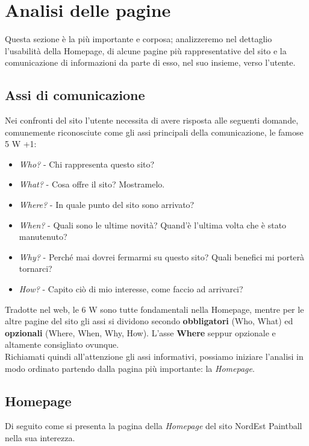 \documentclass[../Relazione.tex]{subfiles}
\begin{document}
\section{Analisi delle pagine}
Questa sezione è la più importante e corposa; analizzeremo nel dettaglio l'usabilità della Homepage, di alcune pagine più rappresentative del sito e la comunicazione di informazioni da parte di esso, nel suo insieme, verso l'utente.
    \subsection{Assi di comunicazione}
    Nei confronti del sito l'utente necessita di avere risposta alle seguenti domande, comunemente riconosciute come gli assi principali della comunicazione, le famose 5 W +1:
    \begin{itemize}
        \item \textit{Who?} - Chi rappresenta questo sito?
        \item \textit{What?} - Cosa offre il sito? Mostramelo.
        \item \textit{Where?} - In quale punto del sito sono arrivato?
        \item \textit{When?} - Quali sono le ultime novità? Quand'è l'ultima volta che è stato manutenuto?
        \item \textit{Why?} - Perché mai dovrei fermarmi su questo sito? Quali benefici mi porterà tornarci?
        \item \textit{How?} - Capito ciò di mio interesse, come faccio ad arrivarci?
    \end{itemize}
Tradotte nel web, le 6 W sono tutte fondamentali nella Homepage, mentre per le altre pagine del sito gli assi si dividono secondo \textbf{obbligatori} (Who, What) ed \textbf{opzionali} (Where, When, Why, How).
L'asse \textbf{Where} seppur opzionale e altamente consigliato ovunque.\vspace*{0,5cm} \\
Richiamati quindi all'attenzione gli assi informativi, possiamo iniziare l'analisi in modo ordinato partendo dalla pagina più importante: la \emph{Homepage}.

\newpage

    \subsection{Homepage}

    Di seguito come si presenta la pagina della \emph{Homepage} del sito NordEst Paintball nella sua interezza.
\end{document}
